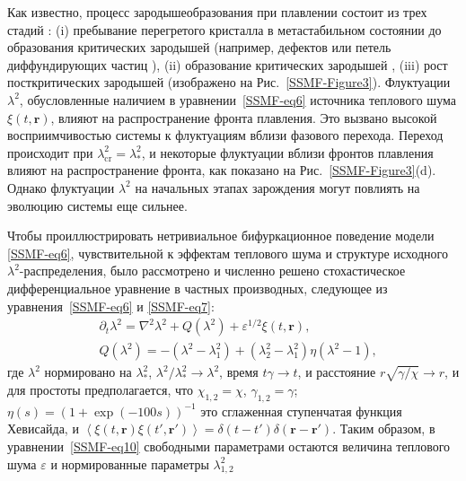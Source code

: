 Как известно, процесс зародышеобразования при плавлении состоит из трех стадий \cite{10.1038/ncomms7942}: (i) пребывание перегретого кристалла в метастабильном состоянии до образования критических зародышей (например, дефектов \cite{10.1038/nmat1375} или петель диффундирующих частиц \cite{10.1103/physrevb.77.134109}), (ii) образование критических зародышей \cite{10.1126/science.1224763, 10.1063/1.2790424, 10.1063/1.2424715},  (iii) рост посткритических зародышей (изображено на Рис.~\ref{SSMF-Figure3}).
Флуктуации $\lambda^2$, обусловленные наличием в уравнении~\eqref{SSMF-eq6} источника теплового шума $\xi(t, \mathbf{r})$, влияют на распространение фронта плавления. Это вызвано высокой восприимчивостью системы к флуктуациям вблизи фазового перехода.
Переход происходит при $\lambda_{\mathrm{cr}}^2=\lambda_\ast^2$,
и некоторые флуктуации вблизи фронтов плавления влияют на распространение фронта, как показано на Рис.~\ref{SSMF-Figure3}(d).
Однако флуктуации $\lambda^2$ на начальных этапах зарождения могут повлиять на эволюцию системы еще сильнее.

Чтобы проиллюстрировать нетривиальное бифуркационное поведение модели \eqref{SSMF-eq6}, чувствительной к эффектам теплового шума и структуре исходного $\lambda^2$-распределения, было рассмотрено и численно решено стохастическое дифференциальное уравнение в частных производных, следующее из уравнения~\eqref{SSMF-eq6} и \eqref{SSMF-eq7}:
\begin{equation}
\label{SSMF-eq10}
\begin{split}
& \partial_t \lambda^2 = \nabla^2\lambda^2 + Q (\lambda^2) +  \varepsilon^{1/2}\xi(t,\mathbf{r}), \\
& Q(\lambda^2) = -(\lambda^2-\lambda_1^2) + (\lambda_2^2-\lambda_1^2)\eta(\lambda^2-1),
\end{split}
\end{equation}
где $\lambda^2$ нормировано на $\lambda_\ast^2$, $\lambda^2/\lambda^2_\ast \rightarrow \lambda^2$,
время $t\gamma \rightarrow t$, и расстояние  $r \sqrt{\gamma/\chi} \rightarrow r$,
и для простоты предполагается, что $\chi_{1,2}=\chi$, $\gamma_{1,2} = \gamma$;
$\eta(s)=(1+\exp(-100 s ))^{-1}$ это сглаженная ступенчатая функция Хевисайда,
и $\left<\xi(t,\mathbf{r})\xi(t',\mathbf{r}')\right>=\delta(t-t')\delta(\mathbf{r}-\mathbf{r'})$.
Таким образом, в уравнении~\eqref{SSMF-eq10} свободными параметрами остаются величина теплового шума $ \varepsilon $ и нормированные параметры $\lambda^2_{1,2}$

